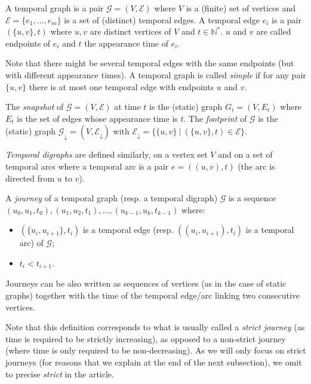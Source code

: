 \documentclass[11pt]{article}%
\newcommand{\G}{\mathcal{G}}
\begin{document}
\begin{definition}
        A temporal graph is a pair $\mathcal{G}=(V,\mathcal{E})$ where $V$ is a (finite) set of vertices and $\mathcal{E}=\{e_1,\dots,e_m\}$ is a set of (distinct) temporal edges. A temporal edge $e_i$ is a pair $(\{u,v\},t)$ where $u,v$ are distinct vertices of $V$ and $t\in \mathbb{N}^*$. $u$ and $v$ are called endpoints of $e_i$ and $t$ the appearance time of $e_i$.
\end{definition}    
    Note that there might be several temporal edges with the same endpoints (but with different appearance times). A temporal graph is called {\it simple} if for any pair $\{u,v\}$ there is at most one temporal edge with endpoints $u$ and $v$. 

    The {\it snapshot} of $\mathcal{G}=(V,\mathcal{E})$ at time $t$ is the (static) graph $G_t=(V,E_t)$ where $E_t$ is the set of edges whose appearance time is $t$. The {\it footprint} of $\G$ is the (static) graph $\G_{\downarrow}=(V,\mathcal{E}_{\downarrow})$ with $\mathcal{E}_{\downarrow}=\{\{u,v\}\:|\:(\{u,v\},t)\in \mathcal{E}\}$.
    
    {\it Temporal digraphs} are defined similarly, on a vertex set $V$ and on a set of temporal arcs where a temporal arc is a pair $e=((u,v),t)$ (the arc is directed from $u$ to $v$).  
    
    \begin{definition}[Journeys]
        A \textit{journey} of a temporal graph (resp. a temporal digraph) $\mathcal{G}$ is a sequence  $(u_0,u_1,t_0),(u_1,u_2,t_1),\dotsc,(u_{k-1},u_k,t_{k-1})$ where:
        \begin{itemize}
            \item $(\{u_i,u_{i+1}\},t_i)$ is a temporal edge (resp. $((u_i,u_{i+1}),t_i)$ is a temporal arc) of $\mathcal{G}$;
            \item $t_i < t_{i+1}$.
        \end{itemize}
    \end{definition} 
    Journeys can be also written as sequences of vertices (as in the case of static graphs) together with the time of the temporal edge/arc linking two consecutive vertices.
    
    Note that this definition corresponds to what is usually called a {\it strict journey} (as time is required to be strictly increasing), as opposed to a non-strict journey (where time is only required to be non-decreasing). As we will only focus on strict journeys (for reasons that we explain at the end of the next subsection), we omit to precise {\it strict} in the article. 
    
\end{document}
